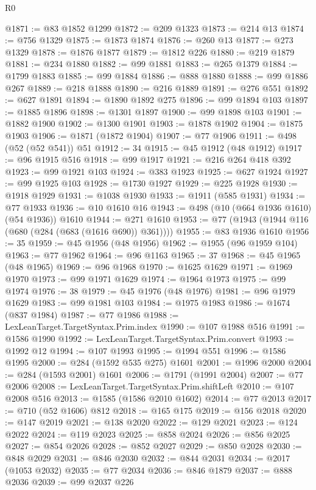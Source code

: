 \begin{lexlean}{R0}
\begin{coremodule}
@1871 := @83 @1852 @1299
@1872 := @209 @1323
@1873 := @214 @13
@1874 := @756 @1329
@1875 := @1873 @1874
@1876 := @260 @13
@1877 := @273 @1329
@1878 := @1876 @1877
@1879 := @1812 @226
@1880 := @219 @1879
@1881 := @234 @1880
@1882 := @99 @1881
@1883 := @265 @1379
@1884 := @1799 @1883
@1885 := @99 @1884
@1886 := @888 @1880
@1888 := @99 @1886 @267
@1889 := @218 @1888
@1890 := @216 @1889
@1891 := @276 @551
@1892 := @627 @1891
@1894 := @1890 @1892 @275
@1896 := @99 @1894 @103
@1897 := @1885 @1896
@1898 := @1301 @1897
@1900 := @99 @1898 @103
@1901 := @1882 @1900
@1902 := @1300 @1901
@1903 := @1878 @1902
@1904 := @1875 @1903
@1906 := @1871 (@1872 @1904)
@1907 := @77 @1906
@1911 := @498 (@52 (@52 @541)) @51
@1912 := 34
@1915 := @45 @1912 (@48 @1912)
@1917 := @96 @1915 @516
@1918 := @99 @1917
@1921 := @216 @264 @418 @392
@1923 := @99 @1921 @103
@1924 := @383 @1923
@1925 := @627 @1924
@1927 := @99 @1925 @103
@1928 := @1730 @1927
@1929 := @225 @1928
@1930 := @1918 @1929
@1931 := @1038 @1930
@1933 := @1911 (@585 @1931)
@1934 := @77 @1933
@1936 := @10 @1610 @16
@1943 := @498 (@10 (@664 @1936 @1610) (@54 @1936)) @1610
@1944 := @271 @1610
@1953 := @77 (@1943 (@1944 @116 (@680 (@284 (@683 (@1616 @690)) @361))))
@1955 := @83 @1936 @1610
@1956 := 35
@1959 := @45 @1956 (@48 @1956)
@1962 := @1955 (@96 @1959 @104)
@1963 := @77 @1962
@1964 := @96 @1163
@1965 := 37
@1968 := @45 @1965 (@48 @1965)
@1969 := @96 @1968
@1970 := @1625 @1629
@1971 := @1969 @1970
@1973 := @99 @1971 @1629
@1974 := @1964 @1973
@1975 := @99 @1974
@1976 := 38
@1979 := @45 @1976 (@48 @1976)
@1981 := @96 @1979 @1629
@1983 := @99 @1981 @103
@1984 := @1975 @1983
@1986 := @1674 (@837 @1984)
@1987 := @77 @1986
@1988 := LexLeanTarget.TargetSyntax.Prim.index
@1990 := @107 @1988 @516
@1991 := @1586 @1990
@1992 := LexLeanTarget.TargetSyntax.Prim.convert
@1993 := @1992 @12
@1994 := @107 @1993
@1995 := @1994 @551
@1996 := @1586 @1995
@2000 := @284 (@1592 @535 @275) @1601
@2001 := @1996 @2000
@2004 := @284 (@1593 @2001) @1601
@2006 := @1791 (@1991 @2004)
@2007 := @77 @2006
@2008 := LexLeanTarget.TargetSyntax.Prim.shiftLeft
@2010 := @107 @2008 @516
@2013 := @1585 (@1586 @2010 @1602)
@2014 := @77 @2013
@2017 := @710 (@52 @1606) @812
@2018 := @165 @175
@2019 := @156 @2018
@2020 := @147 @2019
@2021 := @138 @2020
@2022 := @129 @2021
@2023 := @124 @2022
@2024 := @119 @2023
@2025 := @858 @2024
@2026 := @856 @2025
@2027 := @854 @2026
@2028 := @852 @2027
@2029 := @850 @2028
@2030 := @848 @2029
@2031 := @846 @2030
@2032 := @844 @2031
@2034 := @2017 (@1053 @2032)
@2035 := @77 @2034
@2036 := @846 @1879
@2037 := @888 @2036
@2039 := @99 @2037 @226

\end{coremodule}
\end{lexlean}
